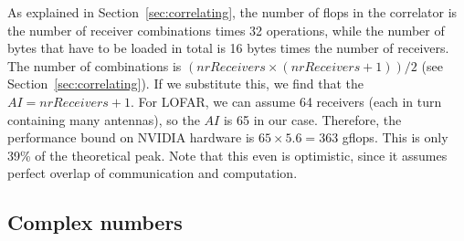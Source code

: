 \documentclass{article}
\newcommand{\longversion}[1]{}
\begin{document}
As explained in Section~\ref{sec:correlating}, the number of flops in the correlator is the
number of receiver combinations times 32 operations, while the number
of bytes that have to be loaded in total is 16 bytes times the number
of receivers.  The
number of combinations is $(nrReceivers \times (nrReceivers + 1)) / 2$ (see Section~\ref{sec:correlating}).
If we substitute this, we find that the $AI = nrReceivers + 1$.  For
LOFAR, we can assume 64 receivers (each in turn containing many
antennas), so the $AI$ is 65 in our case.  Therefore, the performance
bound on NVIDIA hardware is $65 \times 5.6 = 363$ gflops. This is only
39\% of the theoretical peak.  Note that this even is optimistic,
since it assumes perfect overlap of communication and computation.

\subsection{Complex numbers}

\longversion{
Programming languages like C99 and FORTRAN have native support for complex
numbers, which is useful for signal-processing applications.
Arrays of complex numbers can easily be declared like
\texttt{complex float array[16];}.
This declaration enforces real and imaginary values at alternating memory
locations.
Unfortunately, not all architectures have efficient support for complex
multiply and division operations on vector elements that are declared this
way, since these operations require real and imaginary values to be shuffled.
Moreover, the real and imaginary parts of a product are computed differently.

The Blue Gene/P is the only architecture that efficiently supports all complex
operations, while the SSE4 instructions of the Core i7 provide limited support.
To obtain good performance on the other architectures, it may be necessary
to split the complex array into separate arrays for real and imaginary values.
This increases the programming effort, since all complex operations must be
programmed in terms of real operations.
Both formats are commonly used; a library like FFTW3 supports both of them.
}
\end{document}
